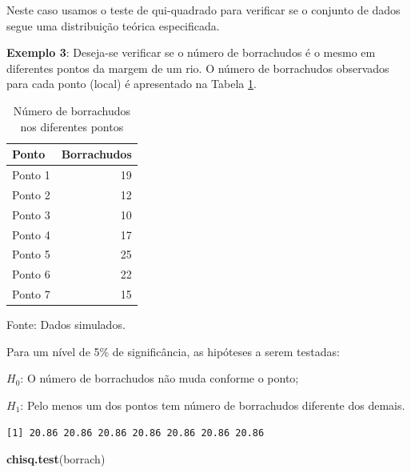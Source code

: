 \documentclass[12pt,brazil,oneside]{book}
\newenvironment{Shaded}{\begin{snugshade}}{\end{snugshade}}
\newcommand{\DecValTok}[1]{\textcolor[rgb]{0.00,0.00,0.81}{#1}}
\newcommand{\KeywordTok}[1]{\textcolor[rgb]{0.13,0.29,0.53}{\textbf{#1}}}
\newcommand{\NormalTok}[1]{#1}
\newcommand{\OperatorTok}[1]{\textcolor[rgb]{0.81,0.36,0.00}{\textbf{#1}}}
\begin{document}
Neste caso usamos o teste de qui-quadrado para verificar se o conjunto de dados segue uma distribuição teórica especificada.

\textbf{Exemplo 3}: Deseja-se verificar se o número de borrachudos é o mesmo em diferentes pontos da margem de um rio. O número de borrachudos observados para cada ponto (local) é apresentado na Tabela \ref{tab:borrach}.

\begin{table}

\caption{\label{tab:borrach}Número de borrachudos nos diferentes pontos}
\centering
\begin{tabular}[t]{l|r}
\hline
Ponto & Borrachudos\\
\hline
Ponto 1 & 19\\
\hline
Ponto 2 & 12\\
\hline
Ponto 3 & 10\\
\hline
Ponto 4 & 17\\
\hline
Ponto 5 & 25\\
\hline
Ponto 6 & 22\\
\hline
Ponto 7 & 15\\
\hline
\end{tabular}
\end{table}

Fonte: Dados simulados.

Para um nível de 5\% de significância, as hipóteses a serem testadas:

\(H_0\): O número de borrachudos não muda conforme o ponto;

\(H_1\): Pelo menos um dos pontos tem número de borrachudos diferente dos demais.

\begin{Shaded}
\end{Shaded}

\begin{verbatim}
[1] 20.86 20.86 20.86 20.86 20.86 20.86 20.86
\end{verbatim}

\begin{Shaded}
\begin{Highlighting}[]
\KeywordTok{chisq.test}\NormalTok{(borrach)}
\end{Highlighting}
\end{Shaded}
\end{document}
